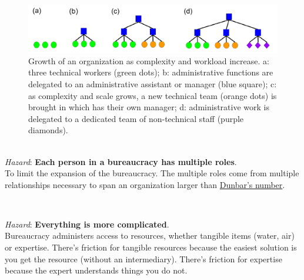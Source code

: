     \begin{figure}
        \centering
        \includegraphics[width=1\textwidth]{images/growth-of-bureaucracy.pdf}
        \caption{Growth of an organization as complexity and workload increase. a: three technical workers (green dots); b: administrative functions are delegated to an administrative assistant or manager (blue square); c: as complexity and scale grows, a new technical team (orange dots) is brought in which has their own manager; d: administrative work is delegated to a dedicated team of non-technical staff (purple diamonds).}
        \label{fig:growth_of_bureaucracy}
    \end{figure}

\ \\
\textit{Hazard}: \textbf{Each person in a bureaucracy has multiple roles}.\\
To limit the expansion of the bureaucracy. The multiple roles come from multiple relationships necessary to span an organization larger than \href{https://en.wikipedia.org/wiki/Dunbar\%27s_number}{Dunbar's number}. \iftoggle{WPinmargin}{\marginpar{[Wikipedia] Dunbar's\\number}}{}

\ \\
\begin{samepage}
\textit{Hazard}: \textbf{Everything is more complicated}. \\
Bureaucracy administers access to resources, whether tangible items (water, air) or expertise. There's friction for tangible resources because the easiest solution is you get the resource (without an intermediary). There's friction for expertise because the expert understands things you do not. 
\end{samepage}

